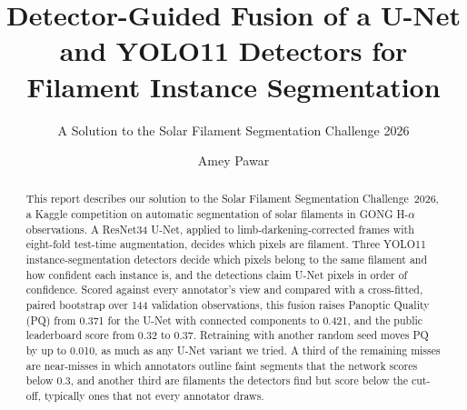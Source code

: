 \documentclass[sigconf]{acmart}
\begin{document}
\title[Detector-Guided Fusion for Filament Segmentation]{Detector-Guided Fusion of a U-Net and YOLO11 Detectors for Filament Instance Segmentation}
\subtitle{A Solution to the Solar Filament Segmentation Challenge 2026} %

\author{Amey Pawar}

\begin{abstract}
This report describes our solution to the Solar Filament Segmentation Challenge~2026, a Kaggle competition on automatic segmentation of solar filaments in GONG H-$\alpha$ observations. A ResNet34 U-Net, applied to limb-darkening-corrected frames with eight-fold test-time augmentation, decides which pixels are filament. Three YOLO11 instance-segmentation detectors decide which pixels belong to the same filament and how confident each instance is, and the detections claim U-Net pixels in order of confidence. Scored against every annotator's view and compared with a cross-fitted, paired bootstrap over 144 validation observations, this fusion raises Panoptic Quality (PQ) from 0.371 for the U-Net with connected components to 0.421, and the public leaderboard score from 0.32 to 0.37. Retraining with another random seed moves PQ by up to 0.010, as much as any U-Net variant we tried. A third of the remaining misses are near-misses in which annotators outline faint segments that the network scores below 0.3, and another third are filaments the detectors find but score below the cut-off, typically ones that not every annotator draws.
\end{abstract}

\maketitle

\end{document}
